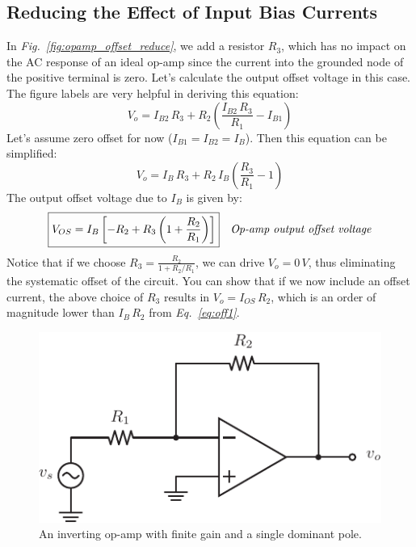 \subsection{Reducing the Effect of Input Bias Currents}
In \emph{Fig.~\ref{fig:opamp_offset_reduce}}, we add a resistor $R_3$, which has no impact on the AC response of an ideal op-amp since the current into the grounded node of the positive terminal is zero.  Let's calculate the output offset voltage in this case.  The figure labels are very helpful in deriving this equation:
    \begin{equation}
          V_o = I_{B2}\,R_3 + R_2\left(\frac{I_{B2}\,R_3}{R_1} - I_{B1}\right)
    \end{equation}
Let's assume zero offset for now ($I_{B1} = I_{B2} = I_B$).  Then this equation can be simplified:
    \begin{equation}
        V_o = I_B\,R_3 + R_2\,I_B\left(\frac{R_3}{R_1} - 1\right)
    \end{equation}
The output offset voltage due to $I_B$ is given by:
    \begin{align}
        \Aboxed{V_{OS} &= I_B\left[-R_2 + R_3\left(1 + \frac{R_2}{R_1}\right)\right]}
        &\textit{Op-amp output offset voltage}
        \label{eq:op_amp_output_offset}
    \end{align}
Notice that if we choose $R_3 = \frac{R_2}{1 + R_2/R_1}$, we can drive $V_o = 0\,V$, thus eliminating the systematic offset of the circuit.  You can show that if we now include an offset current, the above choice of $R_3$ results in $V_o = I_{OS}\,R_2 $, which is an order of magnitude lower than $I_B\,R_2$ from \emph{Eq.~\ref{eq:off1}}.
\newpage
\begin{figure}[tb]
\centering
\includegraphics[scale=1.00]{opamp_invert_gain}
\caption{An inverting op-amp with finite gain and a single dominant pole.}
\label{fig:opamp_invert_gain}
\end{figure}
